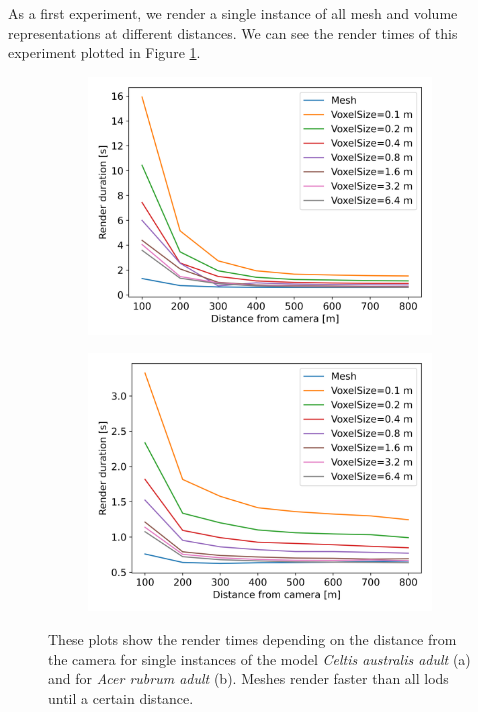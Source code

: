As a first experiment, we render a single instance of all mesh and volume representations at different distances.
We can see the render times of this experiment plotted in Figure \ref{fig:render_time_comparisons}.
\begin{figure}[t]
    \centering
    \begin{subfigure}[b]{0.49\linewidth}
        \centering
        \includegraphics[width=1\linewidth]{img/results/render_durations_EU06a.png}
        \caption{}
    \end{subfigure}
    \begin{subfigure}[b]{0.49\linewidth}
        \centering
        \includegraphics[width=1\linewidth]{img/results/render_durations_EA01a.png}
        \caption{}
    \end{subfigure}
	\caption[Plots of the render times depending on the distance from the camera]{These plots show the render times depending on the distance from the camera for single instances of the model \textit{Celtis australis adult} (a) and for \textit{Acer rubrum adult} (b). Meshes render faster than all \acsp{lod} until a certain distance.}
	\label{fig:render_time_comparisons}
\end{figure}
